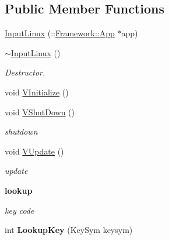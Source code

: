 \subsection*{Public Member Functions}
\begin{Indent}{\bf }\par
{\em \label{_amgrpd41d8cd98f00b204e9800998ecf8427e}
 }\begin{DoxyCompactItemize}
\item 
\hyperlink{classPlatform_1_1InputLinux_a378a85280fe380056552c82130299f59}{InputLinux} (::\hyperlink{classFramework_1_1App}{Framework::App} $\ast$app)
\item 
\hypertarget{classPlatform_1_1InputLinux_a664f96e6dba7f49178e07778dd36d1d7}{
\hyperlink{classPlatform_1_1InputLinux_a664f96e6dba7f49178e07778dd36d1d7}{$\sim$InputLinux} ()}
\label{classPlatform_1_1InputLinux_a664f96e6dba7f49178e07778dd36d1d7}

\begin{DoxyCompactList}\small\item\em Destructor. \item\end{DoxyCompactList}\item 
void \hyperlink{classPlatform_1_1InputLinux_a7197f730a72f6ff7c3f8e98705cfe922}{VInitialize} ()
\item 
\hypertarget{classPlatform_1_1InputLinux_a48306757df32f54ff9fc4833ec96ba15}{
void \hyperlink{classPlatform_1_1InputLinux_a48306757df32f54ff9fc4833ec96ba15}{VShutDown} ()}
\label{classPlatform_1_1InputLinux_a48306757df32f54ff9fc4833ec96ba15}

\begin{DoxyCompactList}\small\item\em shutdown \item\end{DoxyCompactList}\item 
\hypertarget{classPlatform_1_1InputLinux_a0423148476006378d2916bef6476b23b}{
void \hyperlink{classPlatform_1_1InputLinux_a0423148476006378d2916bef6476b23b}{VUpdate} ()}
\label{classPlatform_1_1InputLinux_a0423148476006378d2916bef6476b23b}

\begin{DoxyCompactList}\small\item\em update \item\end{DoxyCompactList}\end{DoxyCompactItemize}
\end{Indent}
\begin{Indent}{\bf lookup}\par
{\em \label{_amgrpbd95200a60e47be9736970fd665f6195}
 key code }\begin{DoxyCompactItemize}
\item 
\hypertarget{classPlatform_1_1InputLinux_a17123f2a052dd42aa888be5d7f723211}{
int {\bfseries LookupKey} (KeySym keysym)}
\label{classPlatform_1_1InputLinux_a17123f2a052dd42aa888be5d7f723211}

\end{DoxyCompactItemize}
\end{Indent}

